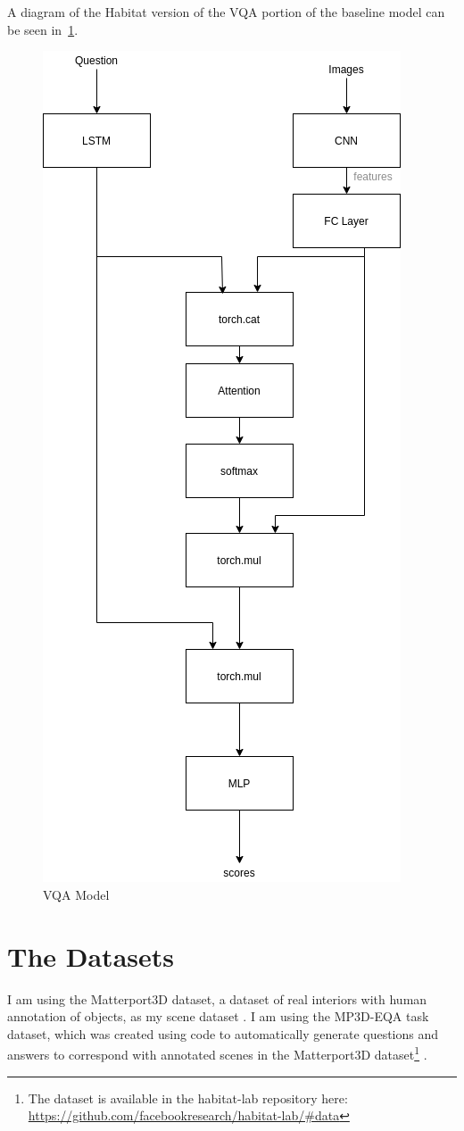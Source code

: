 A diagram of the Habitat version of the VQA portion of the baseline model can be seen in~\ref{fig:baseline_model}. 
\begin{figure}[H]
     \centering
     \includegraphics[width=.5\textwidth]{./figure/baseline_diagram.png}
     \caption{VQA Model}
     \label{fig:baseline_model}
\end{figure}

\section{The Datasets}
I am using the Matterport3D dataset, a dataset of real interiors with human annotation of objects, as my scene dataset \cite{matterport}. 
I am using the MP3D-EQA task dataset, which was created using code to automatically generate questions and answers to correspond with annotated scenes in the Matterport3D dataset\footnote{The dataset is available in the habitat-lab repository here: \url{https://github.com/facebookresearch/habitat-lab/#data}} \cite{eqa_matterport}. 

